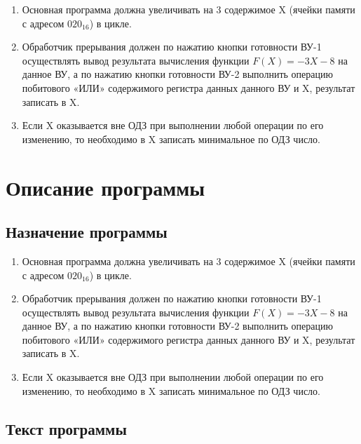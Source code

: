 \documentclass[12pt,a4paper]{article}
\begin{document}
\begin{enumerate}
    \item Основная программа должна увеличивать на 3 содержимое X (ячейки памяти с адресом $020_{16}$) в цикле.
    \item Обработчик прерывания должен по нажатию кнопки готовности ВУ-1 осуществлять вывод результата вычисления функции $F(X) = -3X-8$ на данное ВУ, а по нажатию кнопки готовности ВУ-2 выполнить операцию побитового «ИЛИ» содержимого регистра данных данного ВУ и X, результат записать в X.
    \item Если X оказывается вне ОДЗ при выполнении любой операции по его изменению, то необходимо в X записать минимальное по ОДЗ число.
\end{enumerate}

\section{Описание программы}

\subsection*{Назначение программы}

\begin{enumerate}
    \item Основная программа должна увеличивать на 3 содержимое X (ячейки памяти с адресом $020_{16}$) в цикле.
    \item Обработчик прерывания должен по нажатию кнопки готовности ВУ-1 осуществлять вывод результата вычисления функции $F(X) = -3X-8$ на данное ВУ, а по нажатию кнопки готовности ВУ-2 выполнить операцию побитового «ИЛИ» содержимого регистра данных данного ВУ и X, результат записать в X.
    \item Если X оказывается вне ОДЗ при выполнении любой операции по его изменению, то необходимо в X записать минимальное по ОДЗ число.
\end{enumerate}

\subsection*{Текст программы}
\end{document}
